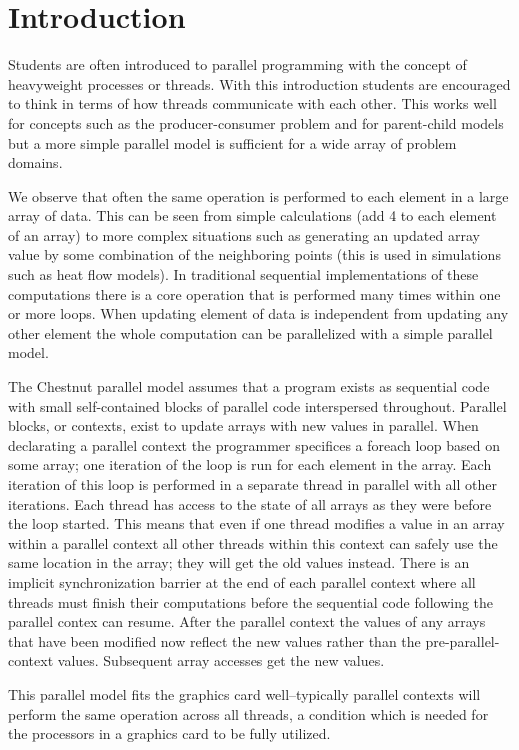 \section{Introduction}

Students are often introduced to parallel programming with the concept of heavyweight processes or threads. With this introduction students are encouraged to think in terms of how threads communicate with each other. This works well for concepts such as the producer-consumer problem and for parent-child models but a more simple parallel model is sufficient for a wide array of problem domains.

We observe that often the same operation is performed to each element in a large array of data. This can be seen from simple calculations (add 4 to each element of an array) to more complex situations such as generating an updated array value by some combination of the neighboring points (this is used in simulations such as heat flow models). In traditional sequential implementations of these computations there is a core operation that is performed many times within one or more loops. When updating element of data is independent from updating any other element the whole computation can be parallelized with a simple parallel model. 

The Chestnut parallel model assumes that a program exists as sequential code with small self-contained blocks of parallel code interspersed throughout. Parallel blocks, or contexts, exist to update arrays with new values in parallel. When declarating a parallel context the programmer specifices a foreach loop based on some array; one iteration of the loop is run for each element in the array. Each iteration of this loop is performed in a separate thread in parallel with all other iterations. Each thread has access to the state of all arrays as they were before the loop started. This means that even if one thread modifies a value in an array within a parallel context all other threads within this context can safely use the same location in the array; they will get the old values instead. There is an implicit synchronization barrier at the end of each parallel context where all threads must finish their computations before the sequential code following the parallel contex can resume. After the parallel context the values of any arrays that have been modified now reflect the new values rather than the pre-parallel-context values. Subsequent array accesses get the new values.

This parallel model fits the graphics card well--typically parallel contexts will perform the same operation across all threads, a condition which is needed for the processors in a graphics card to be fully utilized.


